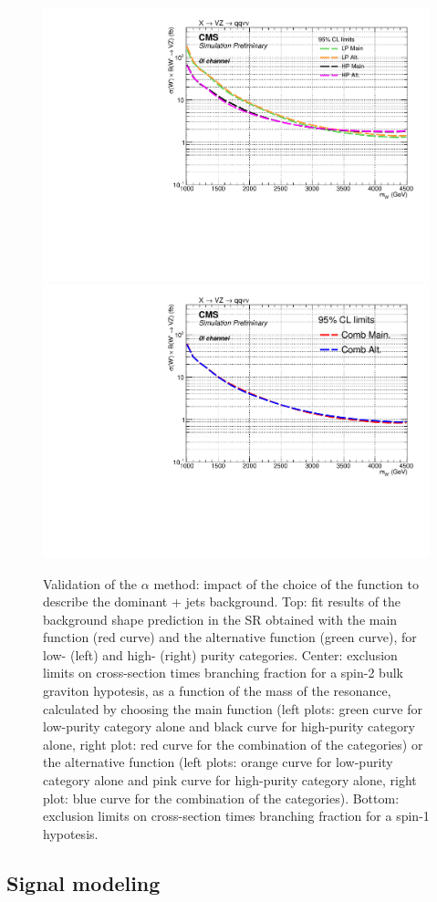 \begin{figure}[!htb]
    \includegraphics[width=.495\textwidth]{BackgroundFunctionValidation/Exclusion_XWZInv_main_vs_alt_LPHP_test.pdf}
    \includegraphics[width=.495\textwidth]{BackgroundFunctionValidation/Exclusion_XWZInv_main_vs_alt_comb_test.pdf}

  \caption{Validation of the $\alpha$ method: impact of the choice of the function to describe the dominant \V + jets background. Top: fit results of the background shape prediction in the SR obtained with the main function (red curve) and the alternative function (green curve), for low- (left) and high- (right) purity categories. Center: exclusion limits on cross-section times branching fraction for a spin-2 bulk graviton hypotesis, as a function of the mass of the resonance, calculated by choosing the main function (left plots: green curve for low-purity category alone and black curve for high-purity category alone, right plot: red curve for the combination of the categories) or the alternative function (left plots: orange curve for low-purity category alone and pink curve for high-purity category alone, right plot: blue curve for the combination of the categories). Bottom: exclusion limits on cross-section times branching fraction for a spin-1 \Wp hypotesis.}
  \label{fig:validation_mainalt}
\end{figure}

\clearpage

\subsection{Signal modeling}

